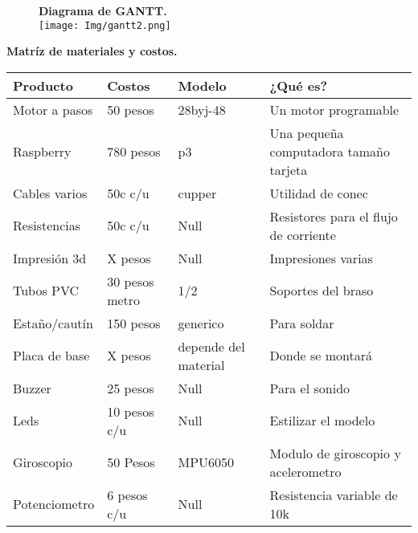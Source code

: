 \documentclass[letterpaper]{article}
\begin{document}
   
   \begin{LARGE}
   \begin{figure}[htbp]
        \textbf{Diagrama de GANTT.}\\
       \texttt{[image: Img/gantt2.png]}
 \end{figure}
   \end{LARGE}
   \newpage
   \begin{large}
       \begin{large}
       \textbf{Matríz de materiales y costos.}
           \begin{table}[htbp]
\begin{tabular}{|l|l|l|l|} 
\hline
Producto      & Costos         & Modelo               & ¿Qué es?                               \\ \hline
Motor a pasos & 50 pesos       & 28byj-48             & Un motor programable                   \\ \hline
Raspberry     & 780 pesos      & p3                   & Una pequeña computadora tamaño tarjeta \\ \hline
Cables varios & 50c c/u        & cupper               & Utilidad de conec                      \\ \hline
Resistencias  & 50c c/u        & Null                 & Resistores para el flujo de corriente  \\ \hline
Impresión 3d  & X pesos        & Null                 & Impresiones varias                     \\ \hline
Tubos PVC     & 30 pesos metro & 1/2                  & Soportes del braso                     \\ \hline
Estaño/cautín & 150 pesos      & generico             & Para soldar                            \\ \hline
Placa de base & X pesos        & depende del material & Donde se montará                       \\ \hline
Buzzer        & 25 pesos       & Null                 & Para el sonido                         \\ \hline
Leds          & 10 pesos c/u   & Null                 & Estilizar el modelo                     \\ \hline
Giroscopio    & 50 Pesos       & MPU6050              & Modulo de giroscopio y acelerometro    \\ \hline
Potenciometro & 6 pesos c/u    & Null                 & Resistencia variable de 10k            \\ \hline
\end{tabular}
\end{table}
       \end{large}
   \end{large}
\end{document}
